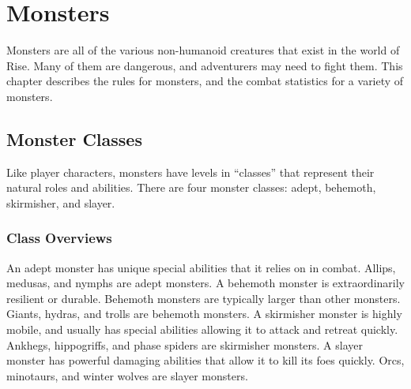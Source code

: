 \chapter{Monsters}

Monsters are all of the various non-humanoid creatures that exist in the world of Rise.
Many of them are dangerous, and adventurers may need to fight them.
This chapter describes the rules for monsters, and the combat statistics for a variety of monsters.

\section{Monster Classes}

    Like player characters, monsters have levels in ``classes'' that represent their natural roles and abilities.
    There are four monster classes: adept, behemoth, skirmisher, and slayer.

    \subsection{Class Overviews}

         An adept monster has unique special abilities that it relies on in combat.
        Allips, medusas, and nymphs are adept monsters.
         A behemoth monster is extraordinarily resilient or durable.
        Behemoth monsters are typically larger than other monsters.
        Giants, hydras, and trolls are behemoth monsters.
         A skirmisher monster is highly mobile, and usually has special abilities allowing it to attack and retreat quickly.
        Ankhegs, hippogriffs, and phase spiders are skirmisher monsters.
         A slayer monster has powerful damaging abilities that allow it to kill its foes quickly.
        Orcs, minotaurs, and winter wolves are slayer monsters.

